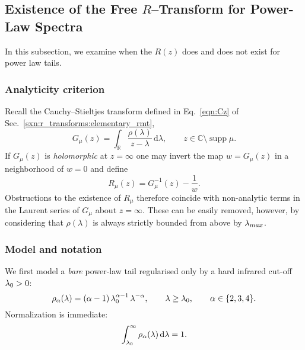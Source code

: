 \subsection{Existence of the Free \texorpdfstring{$R$}{R}–Transform for Power-Law Spectra}
\label{sxn:RTransformExists}

In this subsection, we examine when the \RTransform $R(z)$ does and does not exist
for power law tails.

\subsubsection{Analyticity criterion}
\label{sxn:RTransformExists:criterion}

Recall the Cauchy–Stieltjes transform defined in Eq.~\eqref{eqn:Cz} of
Sec.~\ref{sxn:r_transforms:elementary_rmt},
\begin{equation}
\label{eqn:RTransformExists_Gdef}
G_\mu(z)=\int_{\mathbb R}\frac{\rho(\lambda)}{z-\lambda}\,
         \mathrm d\lambda,
\qquad
z\in\mathbb C\setminus\operatorname{supp}\mu .
\end{equation}
If $G_\mu(z)$ is \emph{holomorphic} at $z=\infty$ one may invert the map
$w=G_\mu(z)$ in a neighborhood of $w=0$ and define
\begin{equation}
\label{eqn:RTransformExists_Rdef}
R_\mu(z)=G_\mu^{-1}(z)-\frac{1}{w}.
\end{equation}
Obstructions to the existence of $R_\mu$ therefore coincide with
non-analytic terms in the Laurent series of $G_\mu$ about $z=\infty$.
These can be easily removed, however, by considering that $\rho(\lambda)$ is always strictly bounded from above by $\lambda_{max}$. 
\subsubsection{Model and notation}
\label{sxn:RTransformExists:model}

We first model a \emph{bare} power-law tail regularised only by a hard
infrared cut-off $\lambda_{0}>0$:
\begin{equation}
\label{eqn:RTransformExists_density_bare}
\rho_{\alpha}(\lambda)=
(\alpha-1)\,\lambda_{0}^{\alpha-1}\,
\lambda^{-\alpha},
\qquad
\lambda\ge\lambda_{0},
\qquad
\alpha\in\{2,3,4\}.
\end{equation}
Normalization is immediate:
\begin{equation}
\label{eqn:RTransformExists_norm}
\int_{\lambda_{0}}^{\infty}\rho_{\alpha}(\lambda)\,
      \mathrm d\lambda = 1.
\end{equation}


